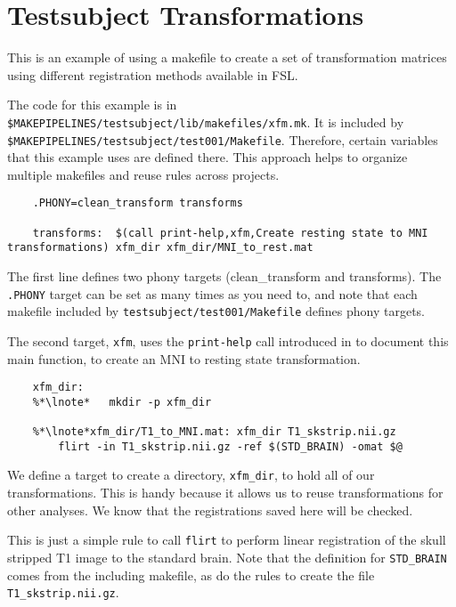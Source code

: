 \section{Testsubject Transformations}
\label{example:testsubjectxfm}

This is an example of using a makefile to create a set of transformation matrices using different registration methods available in FSL. 

The code for this example is in \texttt{\$MAKEPIPELINES/testsubject/lib/makefiles/xfm.mk}. It is included by \texttt{\$MAKEPIPELINES/testsubject/test001/Makefile}. Therefore, certain variables that this example uses are defined there. This approach helps to organize multiple makefiles and reuse rules across projects.

\setcounter{codehighlight}{0} %
\begin{lstlisting}
	.PHONY=clean_transform transforms 

	transforms:  $(call print-help,xfm,Create resting state to MNI transformations) xfm_dir xfm_dir/MNI_to_rest.mat
\end{lstlisting}

The first line defines two phony targets (clean\_transform and transforms). The \texttt{.PHONY} target can be set as many times as you need to, and note that each makefile included by \texttt{testsubject/test001/Makefile} defines phony targets. 

The second target, \texttt{xfm}, uses the \texttt{print-help} call introduced in  to document this main function, to create an MNI to resting state transformation.

\begin{lstlisting}
	xfm_dir:
	%*\lnote*	mkdir -p xfm_dir

	%*\lnote*xfm_dir/T1_to_MNI.mat: xfm_dir T1_skstrip.nii.gz 
		flirt -in T1_skstrip.nii.gz -ref $(STD_BRAIN) -omat $@
\end{lstlisting}

 We define a target to create a directory, \texttt{xfm_dir},
to hold all of our transformations. This is handy because it allows us to
reuse transformations for other analyses. We know that
the registrations saved here will be checked. 

 This is just a simple rule to call \texttt{flirt} to perform
linear registration of the skull stripped T1 image to the standard
brain. Note that the definition for \texttt{STD_BRAIN} comes from the
including makefile, as do the rules to create the file \texttt{T1_skstrip.nii.gz}.


